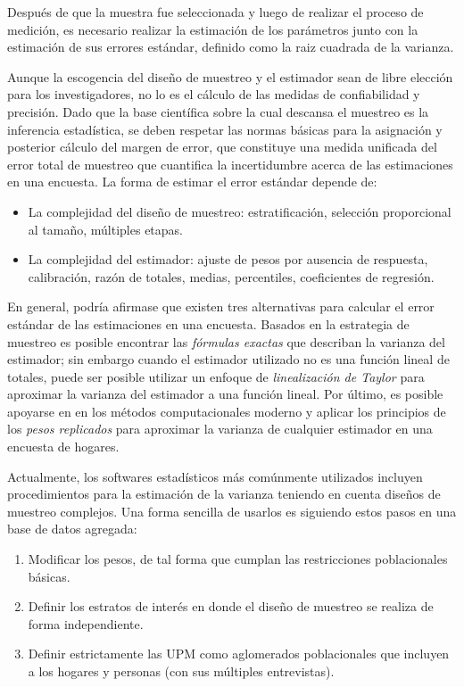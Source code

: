 \documentclass[
  12pt,
  spanish,
]{book}
\providecommand{\tightlist}{%
  \setlength{\itemsep}{0pt}\setlength{\parskip}{0pt}}
\begin{document}
Después de que la muestra fue seleccionada y luego de realizar el proceso de medición, es necesario realizar la estimación de los parámetros junto con la estimación de sus errores estándar, definido como la raiz cuadrada de la varianza.

Aunque la escogencia del diseño de muestreo y el estimador sean de libre elección para los investigadores, no lo es el cálculo de las medidas de confiabilidad y precisión. Dado que la base científica sobre la cual descansa el muestreo es la inferencia estadística, se deben respetar las normas básicas para la asignación y posterior cálculo del margen de error, que constituye una medida unificada del error total de muestreo que cuantifica la incertidumbre acerca de las estimaciones en una encuesta. La forma de estimar el error estándar depende de:

\begin{itemize}
\tightlist
\item
  La complejidad del diseño de muestreo: estratificación, selección proporcional al tamaño, múltiples etapas.
\item
  La complejidad del estimador: ajuste de pesos por ausencia de respuesta, calibración, razón de totales, medias, percentiles, coeficientes de regresión.
\end{itemize}

En general, podría afirmase que existen tres alternativas para calcular el error estándar de las estimaciones en una encuesta. Basados en la estrategia de muestreo es posible encontrar las \emph{fórmulas exactas} que describan la varianza del estimador; sin embargo cuando el estimador utilizado no es una función lineal de totales, puede ser posible utilizar un enfoque de \emph{linealización de Taylor} para aproximar la varianza del estimador a una función lineal. Por último, es posible apoyarse en en los métodos computacionales moderno y aplicar los principios de los \emph{pesos replicados} para aproximar la varianza de cualquier estimador en una encuesta de hogares.

Actualmente, los softwares estadísticos más comúnmente utilizados incluyen
procedimientos para la estimación de la varianza teniendo en cuenta
diseños de muestreo complejos. Una forma sencilla de usarlos es
siguiendo estos pasos en una base de datos agregada:

\begin{enumerate}
\def\labelenumi{\arabic{enumi}.}
\tightlist
\item
  Modificar los pesos, de tal forma que cumplan las restricciones
  poblacionales básicas.
\item
  Definir los estratos de interés en donde el diseño de muestreo se
  realiza de forma independiente.
\item
  Definir estrictamente las UPM como aglomerados poblacionales que
  incluyen a los hogares y personas (con sus múltiples entrevistas).
\end{enumerate}
\end{document}
